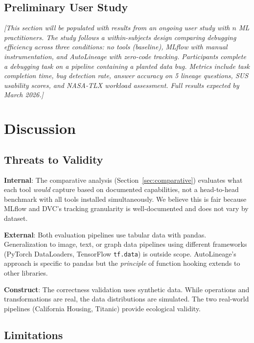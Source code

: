\documentclass[10pt,twocolumn]{article}
\begin{document}
\subsection{Preliminary User Study}
\label{sec:userstudy}

\emph{[This section will be populated with results from an ongoing user study with $n$ ML practitioners. The study follows a within-subjects design comparing debugging efficiency across three conditions: no tools (baseline), MLflow with manual instrumentation, and AutoLineage with zero-code tracking. Participants complete a debugging task on a pipeline containing a planted data bug. Metrics include task completion time, bug detection rate, answer accuracy on 5 lineage questions, SUS usability scores, and NASA-TLX workload assessment. Full results expected by March 2026.]}

\section{Discussion}
\label{sec:discussion}

\subsection{Threats to Validity}

\textbf{Internal}: The comparative analysis (Section~\ref{sec:comparative}) evaluates what each tool \emph{would} capture based on documented capabilities, not a head-to-head benchmark with all tools installed simultaneously. We believe this is fair because MLflow and DVC's tracking granularity is well-documented and does not vary by dataset.

\textbf{External}: Both evaluation pipelines use tabular data with pandas. Generalization to image, text, or graph data pipelines using different frameworks (PyTorch DataLoaders, TensorFlow \texttt{tf.data}) is outside scope. AutoLineage's approach is specific to pandas but the \emph{principle} of function hooking extends to other libraries.

\textbf{Construct}: The correctness validation uses synthetic data. While operations and transformations are real, the data distributions are simulated. The two real-world pipelines (California Housing, Titanic) provide ecological validity.

\subsection{Limitations}
\end{document}
